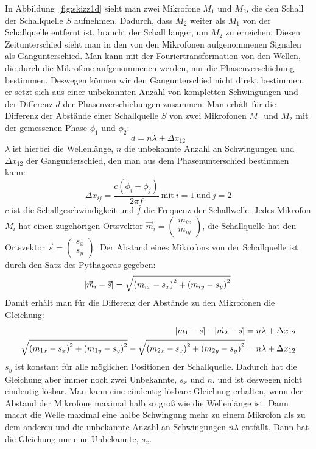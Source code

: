 In Abbildung~\ref{fig:skizz1d} sieht man zwei Mikrofone $M_1$ und $M_2$, die den Schall der Schallquelle $S$ aufnehmen. Dadurch, dass $M_2$ weiter als $M_1$ von der Schallquelle entfernt ist, braucht der Schall länger, um $M_2$ zu erreichen. Diesen Zeitunterschied sieht man in den von den Mikrofonen aufgenommenen Signalen als Gangunterschied. Man kann mit der Fouriertransformation von den Wellen, die durch die Mikrofone aufgenommenen werden, nur die Phasenverschiebung bestimmen. Deswegen können wir den Gangunterschied nicht direkt bestimmen, er setzt sich aus einer unbekannten Anzahl von kompletten Schwingungen und der Differenz $d$ der Phasenverschiebungen zusammen. Man erhält für die Differenz der Abstände einer Schallquelle $S$ von zwei Mikrofonen $M_1$ und $M_2$ mit der gemessenen Phase $\phi_1$ und $\phi_2$: $$d = n\lambda + \Delta{x_{12}}$$ $\lambda$ ist hierbei die Wellenlänge, $n$ die unbekannte Anzahl an Schwingungen und $\Delta{x_{12}}$ der Gangunterschied, den man aus dem Phasenunterschied bestimmen kann:
\begin{equation}
\Delta{x_{ij}} = \frac{c(\phi_i - \phi_j)}{{2\pi}f}\:\textrm{mit}\:i = 1\:\textrm{und}\:j = 2
\end{equation}
$c$ ist die Schallgeschwindigkeit und $f$ die Frequenz der Schallwelle.
Jedes Mikrofon $M_i$ hat einen zugehörigen Ortsvektor $\vec{m}_i = \begin{pmatrix} m_{ix} \\ m_{iy}  \end{pmatrix}$, die Schallquelle hat den Ortsvektor $\vec{s} = \begin{pmatrix} {s_x} \\ {s_y}  \end{pmatrix}$. Der Abstand eines Mikrofons von der Schallquelle ist durch den Satz des Pythagoras gegeben:
\begin{equation}
\abs{\vec{m}_i - \vec{s}} = \sqrt{{(m_{ix} - s_x)}^2 + {(m_{iy} - s_y)}^2}
\end{equation}
Damit erhält man für die Differenz der Abstände zu den Mikrofonen die Gleichung:
\begin{align}
\abs{\vec{m}_1 - \vec{s}} - \abs{\vec{m}_2 - \vec{s}} &= n\lambda + \Delta{x_{12}}\\
\sqrt{{(m_{1x} - s_x)}^2 + {(m_{1y} - s_y)}^2} - \sqrt{{(m_{2x} - s_x)}^2 + {(m_{2y} - s_y)}^2} &= n\lambda + \Delta{x_{12}}
\end{align}
$s_y$ ist konstant für alle möglichen Positionen der Schallquelle. Dadurch hat die Gleichung aber immer noch zwei Unbekannte, $s_x$ und $n$, und ist deswegen nicht eindeutig lösbar. Man kann eine eindeutig lösbare Gleichung erhalten, wenn der Abstand der Mikrofone maximal halb so groß wie die Wellenlänge ist. Dann macht die Welle maximal eine halbe Schwingung mehr zu einem Mikrofon als zu dem anderen und die unbekannte Anzahl an Schwingungen $n\lambda$ entfällt. Dann hat die Gleichung nur eine Unbekannte, $s_x$.
